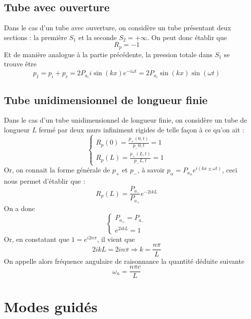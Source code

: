 \subsection{Tube avec ouverture}
Dans le cas d'un tube avec ouverture, on considère un tube présentant deux sections : la première $S_1$ et la seconde $S_2=+\infty$. On peut donc établir que
\[ R_p=-1 \]
Et de manière analogue à la partie précédente, la pression totale dans $S_1$ se trouve être
\[ p_1=p_i+p_r=2P_{a_i}i\sin(kx)e^{-i\omega t}=2P_{a_i}\sin(kx)\sin(\omega t) \]
\subsection{Tube unidimensionnel de longueur finie}
Dans le cas d'un tube unidimensionnel de longueur finie, on considère un tube de longueur $L$ fermé par deux murs infiniment rigides de telle façon à ce qu'on ait :
\[
\left\{
\begin{array}{l}
R_p(0)=\frac{p_+(0,t)}{p_-{0,t}}=1 \\
R_p(L)=\frac{p_+(L,t)}{p_-{L,t}}=1
\end{array}
\right.
\]
Or, on connait la forme générale de $p_+$ et $p_-$, à savoir $p_\alpha=P_{a_\alpha}e^{i(kx\pm\omega t)}$, ceci nous permet d'établir que :
\[ R_p(L)=\frac{P_{a_-}}{P_{a_+}}e^{-2ikL} \]
On a donc 
\[
\left\{
\begin{array}{l}
P_{a_+}=P_{a_-} \\
e^{2ikL}=1
\end{array}
\right.
\]
Or, en constatant que $1=e^{i2n\pi}$, il vient que
\[ 2ikL=2in\pi\Rightarrow k=\frac{n\pi}{L} \]
On appelle alors fréquence angulaire de raisonnance la quantité déduite suivante
\[ \omega_n=\frac{n\pi c}{L} \]
\section{Modes guidés}
